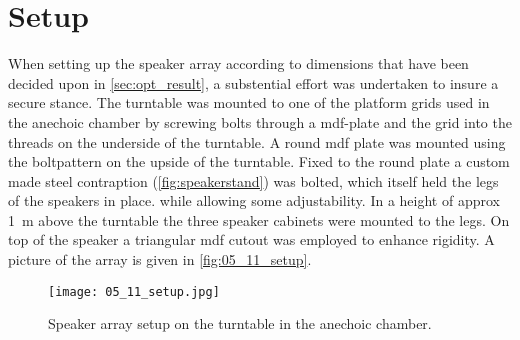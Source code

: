 \section*{Setup}
When setting up the speaker array according to dimensions that have been decided upon in \autoref{sec:opt_result}, a substential effort was undertaken to insure a secure stance. The turntable was mounted to one of the platform grids used in the anechoic chamber by screwing bolts through a \gls{mdf}-plate and the grid into the threads on the underside of the turntable. A round \gls{mdf} plate was mounted using the boltpattern on the upside of the turntable. Fixed to the round plate a custom made steel contraption (\autoref{fig:speakerstand}) was bolted, which itself held the legs of the speakers in place. while allowing some adjustability. In a height of approx \SI{1}{\meter} above the turntable the three speaker cabinets were mounted to the legs. On top of the speaker a triangular \gls{mdf} cutout was employed to enhance rigidity. A picture of the array is given in \autoref{fig:05_11_setup}.

\begin{figure}[h]\label{fig:05_11_setup}
	\centering
    \texttt{[image: 05\_11\_setup.jpg]}
    \caption{Speaker array setup on the turntable in the anechoic chamber.}
\end{figure}

